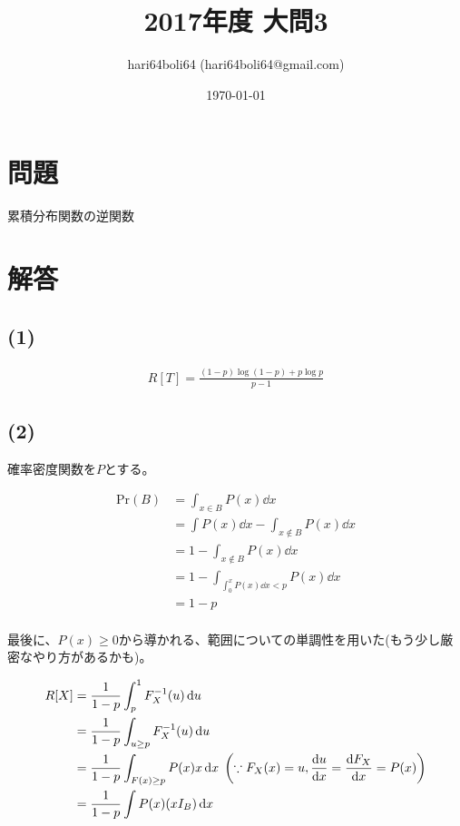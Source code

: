 \documentclass[a4paper, 10pt, dvipdfmx]{jlreq}
\begin{document}
\title{2017年度 大問3}
\author{hari64boli64 (hari64boli64@gmail.com)}
\date{\today}
\maketitle

\section{問題}

累積分布関数の逆関数

\section{解答}

\subsection*{(1)}

\begin{align*}
    R[T]=\frac{(1-p)\log(1-p)+p\log{p}}{p-1}
\end{align*}

\subsection*{(2)}

確率密度関数を$P$とする。

\begin{align*}
    \mathrm{Pr}(B) & = \int_{x \in B} P(x) \dd{x}                       \\
                   & = \int P(x) \dd{x} - \int_{x \notin B} P(x) \dd{x} \\
                   & = 1 - \int_{x \notin B} P(x) \dd{x}                \\
                   & = 1 - \int_{\int_0^x P(x) \dd{x} < p} P(x) \dd{x}  \\
                   & = 1 - p                                            \\
\end{align*}

最後に、$P(x) \geq 0$から導かれる、範囲についての単調性を用いた(もう少し厳密なやり方があるかも)。

\begin{align*}
    R[X] & =\frac{1}{1-p}\int_p^1 F_X^{-1}(u) \dd{u}                                                            \\
         & =\frac{1}{1-p}\int_{u \geq p} F_X^{-1}(u) \dd{u}                                                     \\
         & =\frac{1}{1-p}\int_{F(x) \geq p} P(x)x \dd{x} \; \qty(\because F_X(x)=u, \dv{u}{x}=\dv{F_X}{x}=P(x)) \\
         & =\frac{1}{1-p}\int P(x) (xI_B) \dd{x}                                                                \\
\end{align*}
\end{document}
